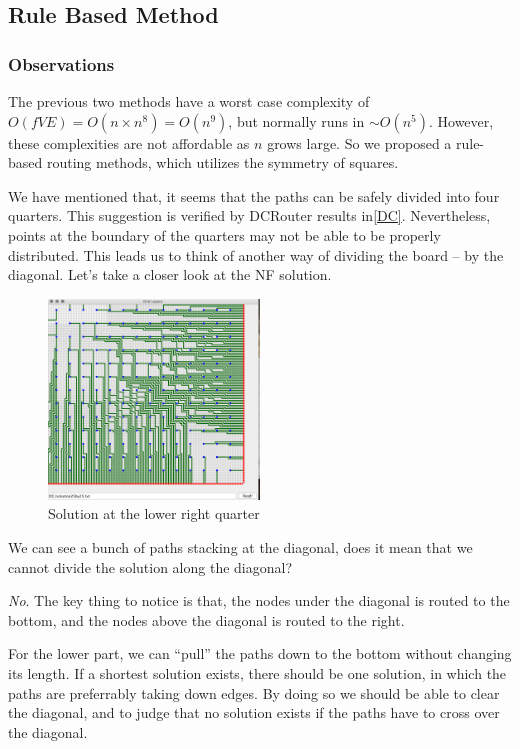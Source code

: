 \documentclass{article}
\begin{document}
\begin{spacing}{1.1}
    \subsection{Rule Based Method}
    \subsubsection{Observations}
    The previous two methods have a worst case complexity of $O(f VE) = O(n \times n^8) = O(n^9)$, but normally runs in $\sim O(n^5)$. However, these complexities are not affordable as $n$ grows large. So we proposed a rule-based routing methods, which utilizes the symmetry of squares.

    We have mentioned that, it seems that the paths can be safely divided into four quarters. This suggestion is verified by DCRouter results in\ref{DC}. Nevertheless, points at the boundary of the quarters may not be able to be properly distributed. This leads us to think of another way
    of dividing the board -- by the diagonal. Let's take a closer look at the NF solution.

    \begin{figure}[H]
        \centering
        \includegraphics[width = 0.5\textwidth]{ove3.png}
        \caption{Solution at the lower right quarter}
        \label{ZOOM}
    \end{figure}

    We can see a bunch of paths stacking at the diagonal, does it mean that we cannot divide the solution along the diagonal?

    \emph{No}. The key thing to notice is that, the nodes under the diagonal is routed to the bottom, and the nodes above the diagonal is routed to the right.

    For the lower part, we can ``pull'' the paths down to the bottom without changing its length. If a shortest solution exists, there should be one solution, in which the paths are preferrably taking down edges. By doing so we should be able to clear the diagonal, and to judge that no solution exists
    if the paths have to cross over the diagonal.


\end{spacing}
\end{document}
